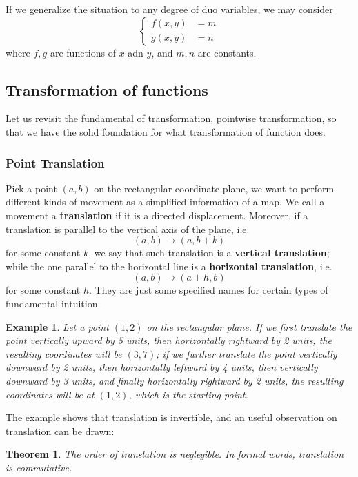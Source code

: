 \documentclass[12pt]{article}
\newtheorem*{theorem}{Theorem}
\newtheorem*{example}{Example}
\begin{document}
    If we generalize the situation to any degree of duo variables, we may consider \[\begin{cases}
        f(x,y)&=m\\
        g(x,y)&=n
    \end{cases}\]
    where $f,g$ are functions of $x$ adn $y$, and $m,n$ are constants.

    \subsection{Transformation of functions}

    Let us revisit the fundamental of transformation, pointwise transformation, so that we have the solid foundation for what transformation of function does.

    \subsubsection*{Point Translation}

    Pick a point $(a,b)$ on the rectangular coordinate plane, we want to perform different kinds of movement as a simplified information of a map. We call a movement a \textbf{translation} if it is a directed displacement. Moreover, if a translation is parallel to the vertical axis of the plane, i.e. \[(a,b)\to (a, b+k)\] for some constant $k$, we say that such translation is a \textbf{vertical translation}; while the one parallel to the horizontal line is a \textbf{horizontal translation}, i.e. \[(a,b)\to (a+h, b)\] for some constant $h$. They are just some specified names for certain types of fundamental intuition.

    \begin{example}
        Let a point $(1,2)$ on the rectangular plane. If we first translate the point vertically upward by 5 units, then horizontally rightward by 2 units, the resulting coordinates will be $(3,7)$; if we further translate the point vertically downward by 2 units, then horizontally leftward by 4 units, then vertically downward by 3 units, and finally horizontally rightward by 2 units, the resulting coordinates will be at $(1,2)$, which is the starting point.
    \end{example}

    The example shows that translation is invertible, and an useful observation on translation can be drawn:

    \begin{theorem}
        The order of translation is neglegible. In formal words, translation is commutative.
    \end{theorem}
\end{document}
